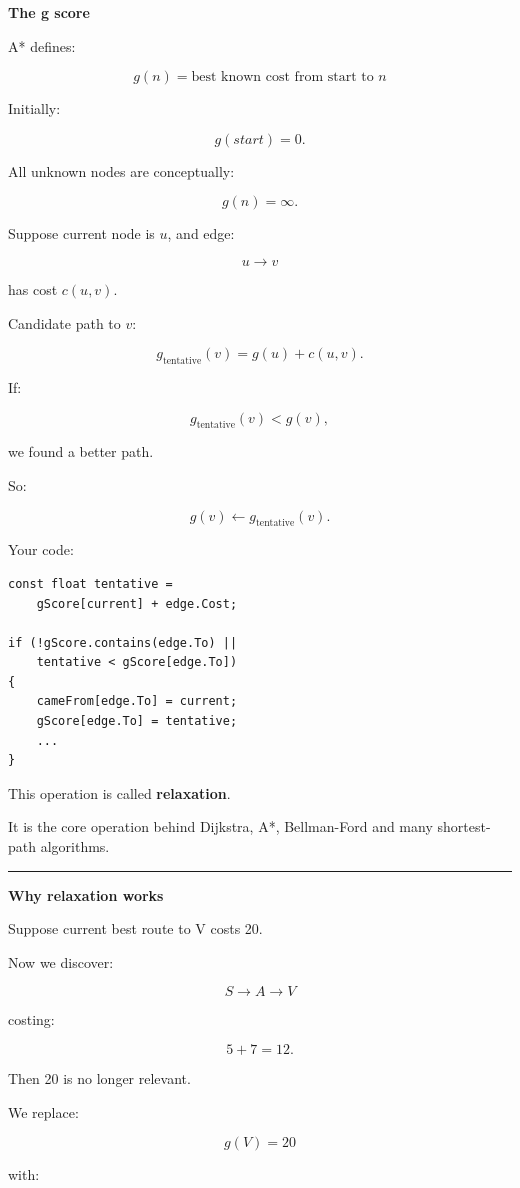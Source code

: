 \textbf{The g score}

A* defines:

\[
\boxed{
g(n)
=
\text{best known cost from start to }n
}
\]

Initially:

\[
g(start)=0.
\]

All unknown nodes are conceptually:

\[
g(n)=\infty.
\]

Suppose current node is \(u\), and edge:

\[
u\rightarrow v
\]

has cost \(c(u,v)\).

Candidate path to \(v\):

\[
g_{\text{tentative}}(v)
=
g(u)+c(u,v).
\]

If:

\[
g_{\text{tentative}}(v)<g(v),
\]

we found a better path.

So:

\[
g(v)
\leftarrow
g_{\text{tentative}}(v).
\]

Your code:

\begin{verbatim}
const float tentative =
    gScore[current] + edge.Cost;

if (!gScore.contains(edge.To) ||
    tentative < gScore[edge.To])
{
    cameFrom[edge.To] = current;
    gScore[edge.To] = tentative;
    ...
}
\end{verbatim}

This operation is called \textbf{relaxation}.

It is the core operation behind Dijkstra, A*, Bellman-Ford and many shortest-path algorithms.

\begin{center}\rule{0.5\linewidth}{0.5pt}\end{center}

\textbf{Why relaxation works}

Suppose current best route to V costs 20.

Now we discover:

\[
S\rightarrow A\rightarrow V
\]

costing:

\[
5+7=12.
\]

Then 20 is no longer relevant.

We replace:

\[
g(V)=20
\]

with:

